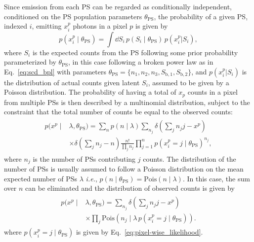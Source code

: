 \documentclass[prd,aps,10pt,nofootinbib,twocolumn,superscriptaddress,preprintnumbers,balancelastpage,longbibliography]{revtex4-1}
\begin{document}
Since emission from each PS can be regarded as conditionally independent, conditioned on the PS population parameters $\theta_\mathrm{PS}$, the probability of a given PS, indexed $i$, emitting $x^p_i$ photons in a pixel $p$ is given by
\begin{equation}
\label{eq:pixel-wise_likelihood}
p(x^p_i\mid\theta_\mathrm{PS}) = \int \dd S_i \,p(S_i\mid\theta_\mathrm{PS})\,p(x^p_i|S_i),
\end{equation}
where $S_i$ is the expected counts from the PS following some prior probability parameterized by $\theta_\mathrm{PS}$, in this case following a broken power law as in Eq.~\eqref{eq:scd_bpl} with parameters $\theta_\mathrm{PS} = \{n_1, n_2, n_3, S_\mathrm{b,1}, S_\mathrm{b,2}\}$, and $p(x^p_i|S_i)$ is the distribution of actual counts given latent $S_i$, assumed to be given by a Poisson distribution. The probability of having a total of $x_p$ counts in a pixel from multiple PSs is then described by a multinomial distribution, subject to the constraint that the total number of counts be equal to the observed counts:
\small
\begin{align}
\label{eq:pixel-wise_likelihood_multinomial}
\begin{split}
p(x^p\mid&\lambda,\theta_\mathrm{PS}) =  \sum_{n}  p\left(n \mid \lambda\right) \sum_{n_{j}} \delta\left(\sum_j n_{j}j - x^p\right) \\ 
&\times \delta\left(\sum_j n_{j} - n\right) \frac{n!}{\prod_j n_{j} }\prod_{j=1}^{n} p(x^p_i = j\mid\theta_\mathrm{PS})  ^ {n_{j}},
\end{split}
\end{align}
\normalsize
where $n_j$ is the number of PSs contributing $j$ counts. The distribution of the number of PSs is usually assumed to follow a Poisson distribution on the mean expected number of PSs $\lambda$ \emph{i.e.}, $p(n\mid\theta_\mathrm{PS}) = \mathrm{Pois}(n\mid\lambda)$. In this case, the sum over $n$ can be eliminated and the distribution of observed counts is given by
\begin{align}
\label{eq:pixel-wise_likelihood_poisson}
\begin{split}
p(x^p\mid&\lambda, \theta_\mathrm{PS}) = \sum_{n_j} \delta\left(\sum_j n_{j}j - x^p\right) \\ & \times \prod_j \mathrm{Pois}\left(n_{j}\mid\lambda \, p(x^p_i = j\mid\theta_\mathrm{PS})\right).
\end{split}
\end{align}
where $p(x^p_i = j\mid\theta_\mathrm{PS})$ is given by Eq.~\eqref{eq:pixel-wise_likelihood}. 
\end{document}

